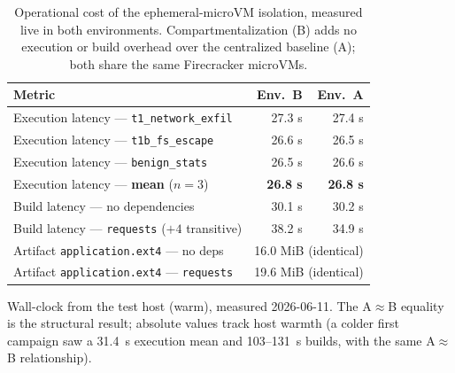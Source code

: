 \begin{table}[t]
\centering
\caption{Operational cost of the ephemeral-microVM isolation, measured live in
both environments. Compartmentalization (B) adds no execution or build overhead
over the centralized baseline (A); both share the same Firecracker microVMs.}
\label{tab:ab-performance}
\footnotesize
\begin{tabularx}{\columnwidth}{@{}Xrr@{}}
\toprule
Metric & Env.~B & Env.~A \\
\midrule
Execution latency --- \texttt{t1\_network\_exfil} & 27.3 s & 27.4 s \\
Execution latency --- \texttt{t1b\_fs\_escape} & 26.6 s & 26.5 s \\
Execution latency --- \texttt{benign\_stats} & 26.5 s & 26.6 s \\
Execution latency --- \textbf{mean} ($n{=}3$) & \textbf{26.8 s} & \textbf{26.8 s} \\
\addlinespace
Build latency --- no dependencies & 30.1 s & 30.2 s \\
Build latency --- \texttt{requests} ($+4$ transitive) & 38.2 s & 34.9 s \\
\addlinespace
Artifact \texttt{application.ext4} --- no deps & \multicolumn{2}{c}{16.0 MiB (identical)} \\
Artifact \texttt{application.ext4} --- \texttt{requests} & \multicolumn{2}{c}{19.6 MiB (identical)} \\
\bottomrule
\end{tabularx}
\par\smallskip
{\footnotesize Wall-clock from the test host (warm), measured 2026-06-11. The
A$\approx$B equality is the structural result; absolute values track host warmth (a
colder first campaign saw a 31.4~s execution mean and 103--131~s builds, with the
same A$\approx$B relationship).}
\end{table}

